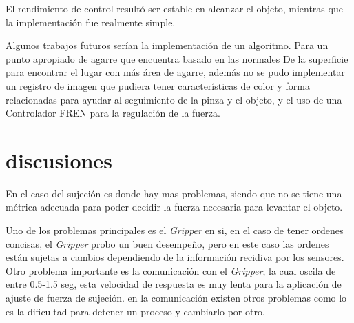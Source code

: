El rendimiento de control resultó ser estable en alcanzar el objeto, mientras que la implementación fue realmente simple.



Algunos trabajos futuros serían la implementación de un algoritmo.
Para un punto apropiado de agarre que encuentra basado en las normales De la superficie para encontrar el lugar con más área de agarre, además no se pudo implementar un registro de imagen que pudiera tener características de color y forma relacionadas para ayudar al seguimiento de la pinza y el objeto, y el uso de una Controlador FREN para la regulación de la fuerza.



\section{discusiones}



En el caso del sujeción es donde hay mas problemas, siendo que no se tiene una métrica adecuada para poder decidir la fuerza necesaria para levantar el objeto.

Uno de los problemas principales es el \textit{Gripper} en si, en el caso de tener ordenes concisas, el \textit{Gripper} probo un buen desempeño, pero en este caso las ordenes están sujetas a cambios dependiendo de la información recidiva por los sensores.
Otro problema importante es la comunicación con el \textit{Gripper}, la cual oscila de entre 0.5-1.5 seg, esta velocidad de respuesta es muy lenta para la aplicación de ajuste de fuerza de sujeción. en la comunicación existen otros problemas como lo es la dificultad para detener un proceso y cambiarlo por otro.

